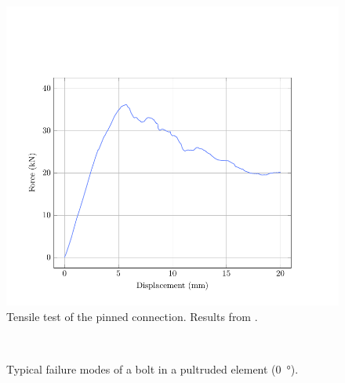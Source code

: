 \begin{figure}[p]
\centering
\begin{fullpage}
	\includegraphics[]{ch2_creteil/plot/6_pin/build.pdf}
	\caption[Tensile test of the pinned connection]{Tensile test of the pinned connection. Results from \cite{Tayeb2015a}.}
	\label{plot:pintest}
\end{fullpage}
\end{figure}

\begin{figure}[p]
     	\centering
	\begin{fullpage}	
		 \\
		\vspace{10pt}
		\caption[Typical failure modes of a bolt in a pultruded element ]{Typical failure modes of a bolt in a pultruded element (\SI{0}{\degree}).}
		\label{fig:breaking}    
	\end{fullpage}
\end{figure}

